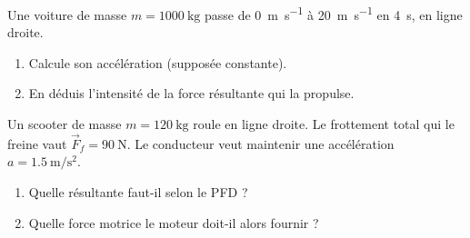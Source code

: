 \documentclass[11pt,a4paper]{article}
\newcommand{\vv}[1]{\vec{#1}}\newcommand{\ds}{\displaystyle}
\begin{document}
\begin{exo}
Une voiture de masse $m=\qty{1000}{\kilogram}$ passe de \qty{0}{\metre\per\second} à
\qty{20}{\metre\per\second} en \qty{4}{\second}, en ligne droite.
\begin{enumerate}[label=\alph*)]
  \item Calcule son accélération (supposée constante).
  \item En déduis l'intensité de la force résultante qui la propulse.
\end{enumerate}
\end{exo}

\begin{exo}
Un scooter de masse $m=\qty{120}{\kilogram}$ roule en ligne droite. Le frottement total qui le freine
vaut $\vv F_f=\qty{90}{\newton}$. Le conducteur veut maintenir une accélération
$a=\qty{1,5}{\metre\per\second\squared}$.
\begin{enumerate}[label=\alph*)]
  \item Quelle résultante faut-il selon le PFD ?
  \item Quelle force motrice le moteur doit-il alors fournir ?
\end{enumerate}
\end{exo}
\end{document}
